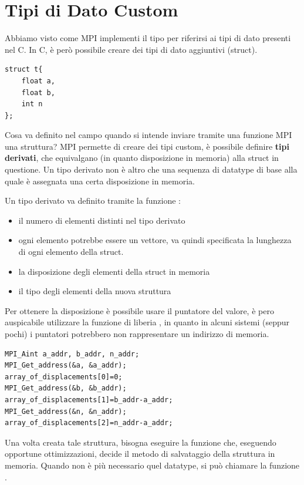 \documentclass[10pt, letterpaper]{report}
\begin{document}
\section{Tipi di Dato Custom}
Abbiamo visto come MPI implementi il tipo 
 per riferirsi ai tipi di dato presenti 
nel C. In C, è però possibile creare dei tipi di dato 
aggiuntivi (struct).
\begin{lstlisting}[style=CStyle]
struct t{
    float a,
    float b,
    int n
};
\end{lstlisting}
Cosa va definito nel campo  quando si 
intende inviare tramite una funzione MPI una struttura? 
MPI permette di creare dei tipi custom, è possibile
definire \textbf{tipi derivati}, che equivalgano (in quanto 
disposizione in memoria) alla struct in questione. Un tipo 
derivato non è altro che una sequenza di 
datatype di base alla quale è assegnata una certa 
disposizione in memoria. \begin{quote}
\end{quote}
Un tipo derivato va definito tramite la funzione 
:\begin{itemize}
    \item {} il numero di elementi distinti nel tipo derivato 
    \item {} ogni elemento potrebbe essere un vettore, va 
    quindi specificata la lunghezza di ogni elemento della struct.
    \item {} la disposizione degli elementi della 
    struct in memoria 
    \item {} il tipo degli elementi della nuova struttura  
\end{itemize}
Per ottenere la disposizione è possibile usare il puntatore del valore,  
è pero auspicabile utilizzare la funzione di liberia 
, in quanto in alcuni sistemi (seppur pochi) i puntatori potrebbero 
non rappresentare un indirizzo di memoria.
\begin{lstlisting}[style=CStyle]
MPI_Aint a_addr, b_addr, n_addr;
MPI_Get_address(&a, &a_addr);
array_of_displacements[0]=0;
MPI_Get_address(&b, &b_addr);
array_of_displacements[1]=b_addr-a_addr;
MPI_Get_address(&n, &n_addr);
array_of_displacements[2]=n_addr-a_addr;
\end{lstlisting}
Una volta creata tale struttura, bisogna eseguire 
la funzione  che, eseguendo opportune ottimizzazioni,
 decide il metodo di salvataggio della struttura in memoria. 
 Quando non è più necessario quel datatype,
  si può chiamare la funzione .
\end{document}
